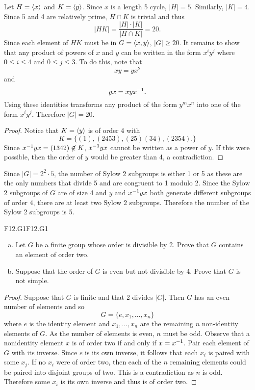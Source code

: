 \documentclass[../AlgebraQualSolutions.tex]{subfiles}
\begin{document}
	\begin{solution}
		Let $H = \left\langle x \right\rangle$ and $K = \left\langle y \right\rangle$. Since $x$ is a length 5 cycle, $|H| = 5$. Similarly, $|K| = 4$. Since 5 and 4 are relatively prime, $H \cap K$ is trivial and thus
			\[|HK| = \frac{|H|\cdot|K|}{|H \cap K|} = 20. \]
		Since each element of $HK$ must be in $G = \left\langle x,y \right\rangle$, $|G| \geq 20$. It remains to show that any product of powers of $x$ and $y$ can be written  in the form $x^iy^j$ where $0 \leq i \leq 4$ and  $0 \leq j \leq 3$. To do this, note that
			\[xy = yx^2\]
		and
			\[yx = xyx^{-1}.\]
		Using these identities transforms any product of the form $y^mx^n$ into one of the form $x^iy^j$. Therefore $|G| = 20$.
	\end{solution}

	\begin{proof}
		Notice that $K = \left\langle y \right\rangle$ is of order 4 with
			\[K = \{(1), (2453), (25)(34), (2354).\}\]
		Since $x^{-1} y x = (1342) \not\in K$, $x^{-1} y x$ cannot be written as a power of $y$. If this were possible, then the order of $y$ would be greater than 4, a contradiction.
	\end{proof}

	\begin{solution}
		Since $|G| = 2^2 \cdot 5$, the number of Sylow 2 subgroups is either 1 or 5 as these are the only numbers that divide 5 and are congruent to 1 modulo 2. Since the Sylow 2 subgroups of $G$ are of size 4 and $y$ and $x^{-1} y x$ both generate different subgroups of order 4, there are at least two Sylow 2 subgroups. Therefore the number of the Sylow 2 subgroups is 5.
	\end{solution}

	\begin{prob}{F12.G1}{F12.G1}
	\begin{enumerate}[(a)]
	\item Let $G$ be a finite group whose order is divisible by 2. Prove that $G$ contains an element of order two.
	\item Suppose that the order of $G$ is even but not divisible by 4. Prove that $G$ is not simple.
	\end{enumerate}
	\end{prob}
	
	\begin{proof}
	Suppose that $G$ is finite and that 2 divides $|G|$. Then $G$ has an even number of elements and so
		\[G = \{e, x_1, \ldots, x_n\}\]
	where $e$ is the identity element and $x_1, \ldots, x_n$ are the remaining $n$ non-identity elements of $G$. As the number of elements is even, $n$ must be odd. Observe that a nonidentity element $x$ is of order two if and only if $x = x^{-1}$. Pair each element of $G$ with its inverse. Since $e$ is its own inverse, it follows that each $x_i$ is paired with some $x_j$. If no $x_i$ were of order two, then each of the $n$ remaining elements could be paired into disjoint groups of two. This is a contradiction as $n$ is odd. Therefore some $x_i$ is its own inverse and thus is of order two. 
	\end{proof}
	
\end{document}
